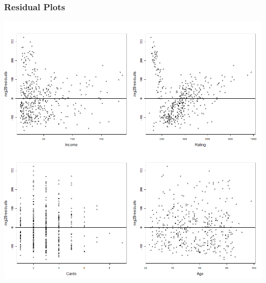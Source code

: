 \documentclass[11pt]{article}
\begin{document}
{\subsubsection*{Residual Plots}
\begin{center}
\includegraphics[scale=0.45]{Residual Plots}
\end{center}


}
\end{document}
